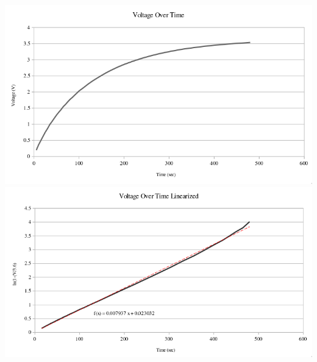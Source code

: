 \documentclass[titlepage]{article}
\begin{document}
			\begin{center}
\includegraphics[width=0.9\linewidth,frame]{Voltage-Time.png}
\FloatBarrier
\vspace{1cm}
\includegraphics[width=0.9\linewidth,frame]{Voltage-Time-Linear.png}
			\end{center}
			\newpage
\end{document}
